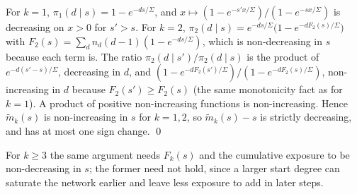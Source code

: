 \documentclass{nws}
\begin{document}
For $k=1$, $\pi_1(d\mid s)=1-e^{-ds/\Sigma}$, and $x\mapsto(1-e^{-s'x/\Sigma})/(1-e^{-sx/\Sigma})$
is decreasing on $x>0$ for $s'>s$. For $k=2$,
$\pi_2(d\mid s)=e^{-ds/\Sigma}\bigl(1-e^{-dF_2(s)/\Sigma}\bigr)$ with
$F_2(s)=\sum_dn_d(d-1)(1-e^{-ds/\Sigma})$, which is non-decreasing in $s$ because
each term is. The ratio $\pi_2(d\mid s')/\pi_2(d\mid s)$ is the product of
$e^{-d(s'-s)/\Sigma}$, decreasing in $d$, and
$(1-e^{-dF_2(s')/\Sigma})/(1-e^{-dF_2(s)/\Sigma})$, non-increasing in $d$ because
$F_2(s')\ge F_2(s)$ (the same monotonicity fact as for $k=1$). A product of positive
non-increasing functions is non-increasing. Hence $\tilde m_k(s)$ is non-increasing in
$s$ for $k=1,2$, so $\tilde m_k(s)-s$ is strictly decreasing, and has at most one
sign change. \qed

For $k\ge3$ the same argument needs $F_k(s)$ and the cumulative exposure to be
non-decreasing in $s$; the former need not hold, since a larger start degree can
saturate the network earlier and leave less exposure to add in later steps.
\end{document}
